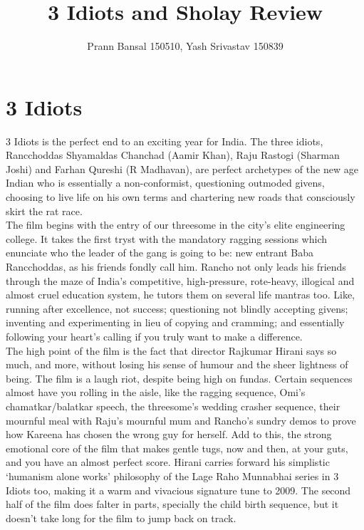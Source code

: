 \documentclass{article}
\title{3 Idiots and Sholay Review}
\author{Prann Bansal 150510, Yash Srivastav 150839}
\begin{document}
\maketitle

\section{3 Idiots}
3 Idiots is the perfect end to an exciting year for India. The three idiots, Rancchoddas Shyamaldas Chanchad (Aamir Khan), Raju Rastogi (Sharman Joshi) and Farhan Qureshi (R Madhavan), are perfect archetypes of the new age Indian who is essentially a non-conformist, questioning outmoded givens, choosing to live life on his own terms and chartering new roads that consciously skirt the rat race.\\
 The film begins with the entry of our threesome in the city's elite engineering college. It takes the first tryst with the mandatory ragging sessions which enunciate who the leader of the gang is going to be: new entrant Baba Rancchoddas, as his friends fondly call him. Rancho not only leads his friends through the maze of India's competitive, high-pressure, rote-heavy, illogical and almost cruel education system, he tutors them on several life mantras too. Like, running after excellence, not success; questioning not blindly accepting givens; inventing and experimenting in lieu of copying and cramming; and essentially following your heart's calling if you truly want to make a difference.\\
The high point of the film is the fact that director Rajkumar Hirani says so much, and more, without losing his sense of humour and the sheer lightness of being. The film is a laugh riot, despite being high on fundas. Certain sequences almost have you rolling in the aisle, like the ragging sequence, Omi's chamatkar/balatkar speech, the threesome's wedding crasher sequence, their mournful meal with Raju's mournful mum and Rancho's sundry demos to prove how Kareena has chosen the wrong guy for herself. Add to this, the strong emotional core of the film that makes gentle tugs, now and then, at your guts, and you have an almost perfect score. Hirani carries forward his simplistic `humanism alone works' philosophy of the Lage Raho Munnabhai series in 3 Idiots too, making it a warm and vivacious signature tune to 2009. The second half of the film does falter in parts, specially the child birth sequence, but it doesn't take long for the film to jump back on track.\\
\end{document}
